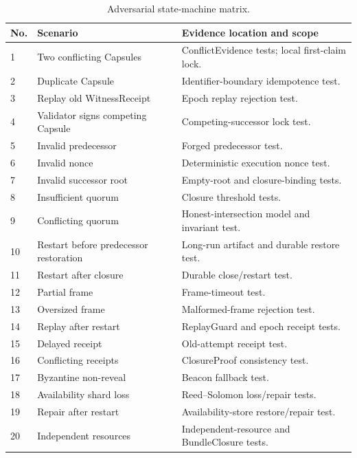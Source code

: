 \documentclass{ledger}
\begin{document}
\begin{table}[h]
\centering
\small
\caption{Adversarial state-machine matrix.}
\label{tab:adversarial}
\begin{tabularx}{\textwidth}{p{0.35cm}p{3.5cm}X}
\toprule
No. & Scenario & Evidence location and scope \\
\midrule
1 & Two conflicting Capsules & ConflictEvidence tests; local first-claim lock. \\
2 & Duplicate Capsule & Identifier-boundary idempotence test. \\
3 & Replay old WitnessReceipt & Epoch replay rejection test. \\
4 & Validator signs competing Capsule & Competing-successor lock test. \\
5 & Invalid predecessor & Forged predecessor test. \\
6 & Invalid nonce & Deterministic execution nonce test. \\
7 & Invalid successor root & Empty-root and closure-binding tests. \\
8 & Insufficient quorum & Closure threshold tests. \\
9 & Conflicting quorum & Honest-intersection model and invariant test. \\
10 & Restart before predecessor restoration & Long-run artifact and durable restore test. \\
11 & Restart after closure & Durable close/restart test. \\
12 & Partial frame & Frame-timeout test. \\
13 & Oversized frame & Malformed-frame rejection test. \\
14 & Replay after restart & ReplayGuard and epoch receipt tests. \\
15 & Delayed receipt & Old-attempt receipt test. \\
16 & Conflicting receipts & ClosureProof consistency test. \\
17 & Byzantine non-reveal & Beacon fallback test. \\
18 & Availability shard loss & Reed--Solomon loss/repair tests. \\
19 & Repair after restart & Availability-store restore/repair test. \\
20 & Independent resources & Independent-resource and BundleClosure tests. \\
\bottomrule
\end{tabularx}
\end{table}
\end{document}
